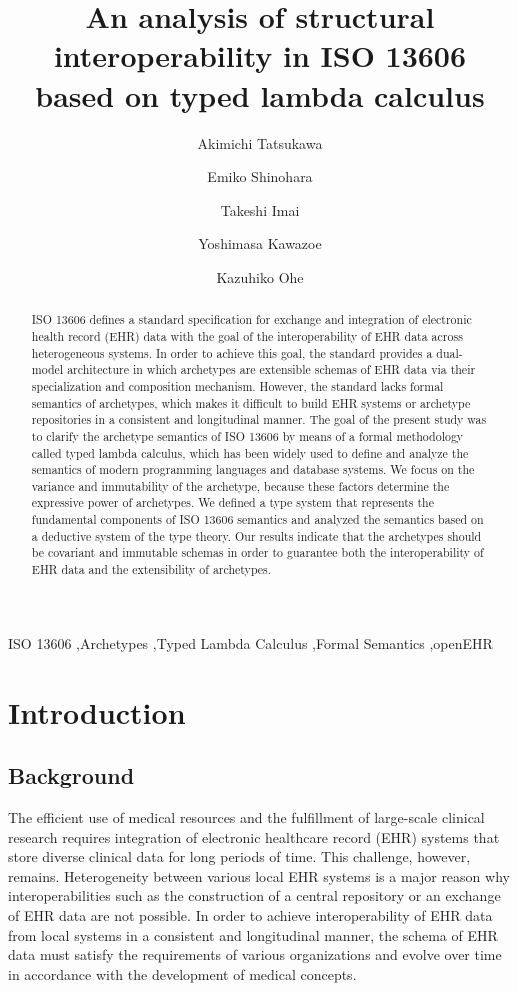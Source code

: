 \documentclass[preprint,3p,onecolumn,times,review]{elsarticle}
\title{An analysis of structural interoperability in ISO 13606\\ based on typed lambda calculus}
\author[plan]{Akimichi Tatsukawa\corref{cor1}}
\author[disease]{Emiko Shinohara}
\author[plan]{Takeshi Imai}
\author[plan]{Yoshimasa Kawazoe}
\author[plan]{Kazuhiko Ohe}
\begin{document}
\begin{frontmatter}

\begin{abstract}
  ISO 13606 defines a standard specification for exchange and integration of electronic health record (EHR) data with the goal of the interoperability of EHR data across heterogeneous systems.
  In order to achieve this goal, the standard provides a dual-model architecture in which archetypes are extensible schemas of EHR data via their specialization and composition mechanism.
  However, the standard lacks formal semantics of archetypes, which makes it difficult to build EHR systems or archetype repositories in a consistent and longitudinal manner.
  The goal of the present study was to clarify the archetype semantics of ISO 13606 by means of a formal methodology called typed lambda calculus, which has been widely used to define and analyze the semantics of modern programming languages and database systems.
  We focus on the variance and immutability of the archetype, because these factors determine the expressive power of archetypes.
  We defined a type system that represents the fundamental components of ISO 13606 semantics and analyzed the semantics based on a deductive system of the type theory.
  Our results indicate that the archetypes should be covariant and immutable schemas in order to guarantee both the interoperability of EHR data and the extensibility of archetypes.
\end{abstract}



\begin{keyword}
  ISO 13606 \sep Archetypes \sep Typed Lambda Calculus \sep Formal Semantics \sep openEHR
\end{keyword}

\end{frontmatter}


\section{Introduction}

\subsection{Background}

The efficient use of medical resources and the fulfillment of large-scale clinical research requires integration of electronic healthcare record (EHR) systems that store diverse clinical data for long periods of time.
This challenge, however, remains.
Heterogeneity between various local EHR systems is a major reason why interoperabilities such as the construction of a central repository or an exchange of EHR data are not possible.
In order to achieve interoperability of EHR data from local systems in a consistent and longitudinal manner, the schema of EHR data must satisfy the requirements of various organizations and evolve over time in accordance with the development of medical concepts.
\end{document}

